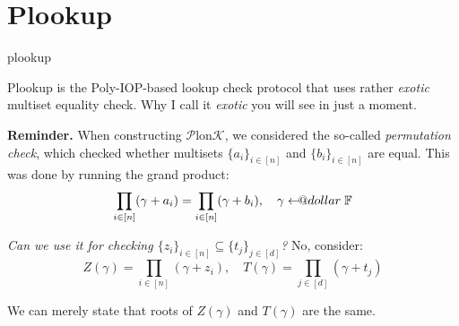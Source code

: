 \documentclass{zkdl-presentation-template}
\makeatletter
\newcommand\leftarrowS{\leftarrow\joinrel\smalldollar}
\newcommand{\smalldollar}{\mathrel{\mathpalette\small@dollar\relax}}
\newcommand{\small@dollar}[2]{%
  \vcenter{\hbox{%
    $#1\textnormal{\fontsize{0.7\dimexpr\f@size pt}{0}\selectfont\$}$%
  }}%
}
\makeatother
\begin{document}
    \section{Plookup}

    \begin{frame}{plookup}
        \begin{definition}
            Plookup is the Poly-IOP-based lookup check protocol that uses rather
            \textit{exotic} multiset equality check. Why I call it
            \textit{exotic} you will see in just a moment.\pause
        \end{definition}

        \textbf{Reminder.} When constructing $\mathcal{P}$lon$\mathcal{K}$, we considered the
        so-called \textit{permutation check}, which checked whether
        multisets $\{a_i\}_{i \in [n]}$ and $\{b_i\}_{i \in [n]}$ are equal.\pause\hspace{1.0px} This was done by running 
        the grand product:
        \begin{equation*}
            \prod_{i \in [n]} (\gamma+a_i) = \prod_{i \in [n]}(\gamma+b_i), \quad \gamma \leftarrowS \mathbb{F}
        \end{equation*}

        \vspace{-15px}

        \pause\textit{Can we use it for checking $\{z_i\}_{i\in [n]} \subseteq
        \{t_j\}_{j \in [d]}$?}\pause\hspace{1.0px} No, consider:
        \begin{equation*}
            Z(\gamma) = \prod_{i \in [n]} (\gamma + z_i), \quad T(\gamma) = \prod_{j \in [d]} (\gamma + t_j)
        \end{equation*}

        \vspace{-15px}

        We can merely state that roots of $Z(\gamma)$ and $T(\gamma)$ are the
        same.
    \end{frame}
\end{document}
